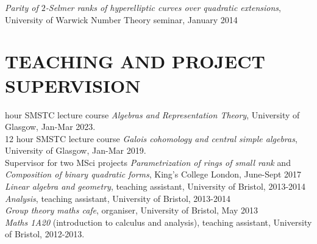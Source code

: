 \documentclass{res}
\begin{document}
\begin{resume}
 {\it Parity of $2$-Selmer ranks of hyperelliptic curves over quadratic extensions}, University of Warwick Number Theory seminar, January 2014  \medskip \\
       
%
%

\section{TEACHING AND PROJECT SUPERVISION}       

 hour SMSTC lecture course {\it Algebras and Representation Theory}, University of Glasgow, Jan-Mar 2023.\medskip\\
12 hour SMSTC lecture course {\it Galois cohomology and central simple algebras}, University of Glasgow, Jan-Mar 2019.\medskip\\
Supervisor for two MSci projects {\it Parametrization of rings of small rank} 
\textup{and} {\it Composition of binary quadratic forms}\textup{, King's College London, June-Sept 2017} \medskip\\   
    {\it Linear algebra and geometry}, teaching assistant, University of Bristol, 2013-2014 \medskip\\         
    {\it Analysis}, teaching assistant, University of Bristol, 2013-2014 \medskip \\
{\it Group theory maths cafe}, organiser, University of Bristol, May 2013 \medskip \\
    {\it Maths 1A20} (introduction to calculus and analysis), teaching assistant, University of Bristol, 2012-2013. 
 


\end{resume}
\end{document}
